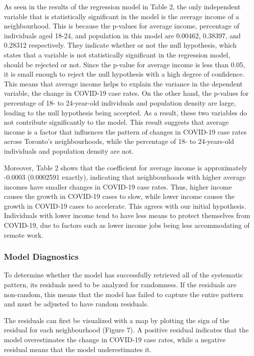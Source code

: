 \documentclass[]{article}
\begin{document}
As seen in the results of the regression model in Table 2, the only
independent variable that is statistically significant in the model is
the average income of a neighbourhood. This is because the p-values for
average income, percentage of individuals aged 18-24, and population in
this model are 0.00462, 0.38397, and 0.28312 respectively. They indicate
whether or not the null hypothesis, which states that a variable is not
statistically significant in the regression model, should be rejected or
not. Since the p-value for average income is less than 0.05, it is small
enough to reject the null hypothesis with a high degree of confidence.
This means that average income helps to explain the variance in the
dependent variable, the change in COVID-19 case rates. On the other
hand, the p-values for percentage of 18- to 24-year-old individuals and
population density are large, leading to the null hypothesis being
accepted. As a result, these two variables do not contribute
significantly to the model. This result suggests that average income is
a factor that influences the pattern of changes in COVID-19 case rates
across Toronto's neighbourhoods, while the percentage of 18- to
24-years-old individuals and population density are not.

Moreover, Table 2 shows that the coefficient for average income is
approximately -0.0003 (0.0002591 exactly), indicating that
neighbourhoods with higher average incomes have smaller changes in
COVID-19 case rates. Thus, higher income causes the growth in COVID-19
cases to slow, while lower income causes the growth in COVID-19 cases to
accelerate. This agrees with our initial hypothesis. Individuals with
lower income tend to have less means to protect themselves from
COVID-19, due to factors such as lower income jobs being less
accommodating of remote work.

\hypertarget{model-diagnostics}{%
\subsubsection{Model Diagnostics}\label{model-diagnostics}}

To determine whether the model has successfully retrieved all of the
systematic pattern, its residuals need to be analyzed for randomness. If
the residuals are non-random, this means that the model has failed to
capture the entire pattern and must be adjusted to have random
residuals.

The residuals can first be visualized with a map by plotting the sign of
the residual for each neighbourhood (Figure 7). A positive residual
indicates that the model overestimates the change in COVID-19 case
rates, while a negative residual means that the model underestimates it.
\end{document}
